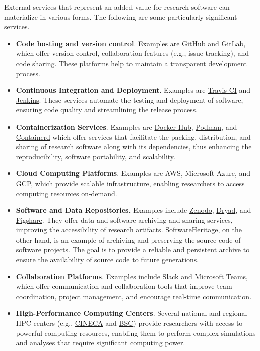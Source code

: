 External services that represent an added value for research software can materialize in various forms. The following are some particularly significant services.
\begin{itemize}
\item \textbf{Code hosting and version control}. Examples are \href{https://github.com}{GitHub} and \href{https://about.gitlab.com/}{GitLab}, which offer version control, collaboration features (e.g., issue tracking), and code sharing. These platforms help to maintain a transparent development process. 
\item \textbf{Continuous Integration and Deployment}. Examples are \href{https://www.travis-ci.com/}{Travis CI} and \href{https://jenkins.io}{Jenkins}. These services automate the testing and deployment of software, ensuring code quality and streamlining the release process. 
\item \textbf{Containerization Services}. Examples are \href{https://hub.docker.com/}{Docker Hub}, \href{https://podman.io}{Podman}, and \href{https://containerd.io}{Containerd} which offer services that facilitate the packing, distribution, and sharing of research software along with its dependencies, thus enhancing the reproducibility, software portability, and scalability. 
\item \textbf{Cloud Computing Platforms}. Examples are \href{https://aws.amazon.com/}{AWS}, \href{https://azure.microsoft.com/}{Microsoft Azure}, and \href{https://cloud.google.com/}{GCP}, which provide scalable infrastructure, enabling researchers to access computing resources on-demand. 
\item \textbf{Software and Data Repositories}. Examples include \href{https://zenodo.org/}{Zenodo}, \href{https://datadryad.org/}{Dryad}, and \href{https://figshare.com/}{Figshare}. They offer data and software archiving and sharing services, improving the accessibility of research artifacts. \href{https://www.softwareheritage.org/}{SoftwareHeritage}, on the other hand, is an example of archiving and preserving the source code of software projects. The goal is to provide a reliable and persistent archive to ensure the availability of source code to future generations.
\item \textbf{Collaboration Platforms}. Examples include \href{https://slack.com}{Slack} and \href{https://www.microsoft.com/en-us/microsoft-teams/group-chat-software}{Microsoft Teams}, which offer communication and collaboration tools that improve team coordination, project management, and encourage real-time communication.
\item \textbf{High-Performance Computing Centers}. Several national and regional HPC centers (e.g., \href{https://www.cineca.it/en}{CINECA} and \href{https://www.bsc.es/}{BSC}) provide researchers with access to powerful computing resources, enabling them to perform complex simulations and analyses that require significant computing power.
\end{itemize}

